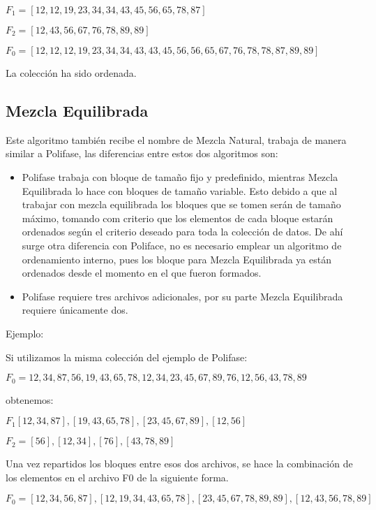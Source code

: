 \documentclass[letterpaper,12pt]{extarticle}
\begin{document}
$F_{1} = { [12,12,19,23,34,34,43,45,56,65,78,87 ] }$

$F_{2} = { [ 12,43,56,67,76,78,89,89 ] }$

$F_{0} = { [12,12,12,19,23,34,34,43,43,45,56,56,65,67,76,78,78,87,89,89 ] }$


La colección ha sido ordenada.

\subsection{Mezcla Equilibrada}

Este algoritmo también recibe el nombre de Mezcla Natural, trabaja de manera similar a Polifase, las diferencias entre estos dos algoritmos son:


\begin{itemize}

\item Polifase trabaja con bloque de tamaño fijo y predefinido, mientras Mezcla Equilibrada lo hace con bloques de tamaño variable. Esto debido a que al trabajar con mezcla equilibrada los bloques que se tomen serán de tamaño máximo, tomando com criterio que los elementos de cada bloque estarán ordenados según el criterio deseado para toda la colección de datos. De ahí surge otra diferencia con Poliface, no es necesario emplear un algoritmo de ordenamiento interno, pues los bloque para Mezcla Equilibrada ya están ordenados desde el momento en el que fueron formados.

\item Polifase requiere tres archivos adicionales, por su parte Mezcla Equilibrada requiere únicamente dos.

\end{itemize}

Ejemplo:

Si utilizamos la misma colección del ejemplo de Polifase:

 $F_{0}= {12,34,87,56,19,43,65,78,12,34,23,45,67,89,76,12,56,43,78,89}$
 
obtenemos:

$F_{1} { [ 12,34,87 ], [ 19,43,65,78 ], [ 23,45,67,89 ], [ 12,56 ] }$

$F_{2} = { [56], [ 12,34 ] ,[ 76 ], [ 43,78,89 ] }$

Una vez repartidos los bloques entre esos dos archivos, se hace la combinación de los elementos en el archivo F0 de la siguiente forma.

$F_{0} = { [ 12,34,56,87 ], [ 12,19,34,43,65,78 ], [ 23,45,67,78,89,89 ], [ 12,43,56,78,89 ] }$
\end{document}
